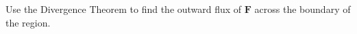 \begin{mdframed}[ backgroundcolor=lightblue, linewidth=1pt, hidealllines=true]
\begin{ExerciseList}
Use the Divergence Theorem to find the outward flux of \( \mathbf{F} \) across the boundary of the region.






\end{ExerciseList}
\end{mdframed}
